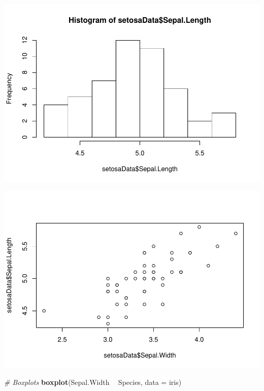 \documentclass[
]{book}
\newenvironment{Shaded}{\begin{snugshade}}{\end{snugshade}}
\newcommand{\CommentTok}[1]{\textcolor[rgb]{0.56,0.35,0.01}{\textit{#1}}}
\newcommand{\DataTypeTok}[1]{\textcolor[rgb]{0.13,0.29,0.53}{#1}}
\newcommand{\KeywordTok}[1]{\textcolor[rgb]{0.13,0.29,0.53}{\textbf{#1}}}
\newcommand{\NormalTok}[1]{#1}
\newcommand{\OperatorTok}[1]{\textcolor[rgb]{0.81,0.36,0.00}{\textbf{#1}}}
\newcommand{\StringTok}[1]{\textcolor[rgb]{0.31,0.60,0.02}{#1}}
\begin{document}
\includegraphics{worstr_files/figure-latex/unnamed-chunk-54-1.pdf}

\begin{Shaded}
\end{Shaded}

\includegraphics{worstr_files/figure-latex/unnamed-chunk-54-2.pdf}

\begin{Shaded}
\begin{Highlighting}[]
\CommentTok{# Boxplots}
\KeywordTok{boxplot}\NormalTok{(Sepal.Width }\OperatorTok{~}\StringTok{ }\NormalTok{Species, }\DataTypeTok{data =}\NormalTok{ iris)}
\end{Highlighting}
\end{Shaded}
\end{document}
